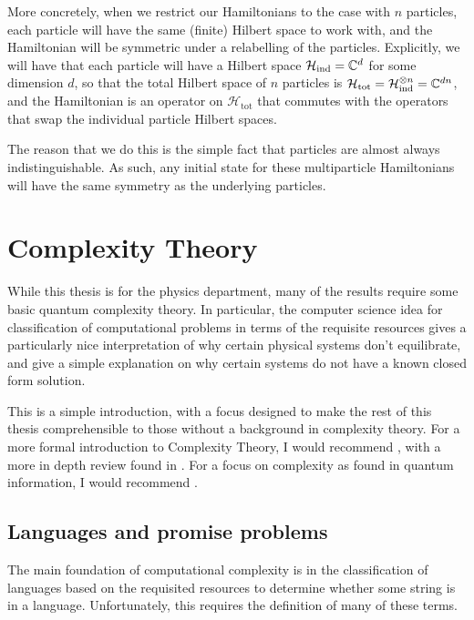 \documentclass[../thesis-main/thesis-main]{subfiles}
\begin{document}
More concretely, when we restrict our Hamiltonians to the case with $n$ particles, each particle will have the same (finite) Hilbert space to work with, and the Hamiltonian will be symmetric under a relabelling of the particles.  Explicitly, we will have that each particle will have a Hilbert space $\mathcal{H}_{\text{ind}} = \mathbb{C}^{d}$ for some dimension $d$, so that the total Hilbert space of $n$ particles is $\mathcal{H}_{\text{tot}}  = \mathcal{H}_{\text{ind}}^{\otimes n} = \mathbb{C}^{dn}$, and the Hamiltonian is an operator on $\mathcal{H}_{\text{tot}}$ that commutes with the operators that swap the individual particle Hilbert spaces.


The reason that we do this is the simple fact that particles are almost always indistinguishable.  As such, any initial state for these multiparticle Hamiltonians will have the same symmetry as the underlying particles.  

\section{Complexity Theory}
\label{sec:complexity_theory}

While this thesis is for the physics department, many of the results require some basic quantum complexity theory.  In particular, the computer science idea for classification of computational problems in terms of the requisite resources gives a particularly nice interpretation of why certain physical systems don't equilibrate, and give a simple explanation on why certain systems do not have a known closed form solution.

This is a simple introduction, with a focus designed to make the rest of this thesis comprehensible to those without a background in complexity theory.  For a more formal introduction to Complexity Theory, I would recommend \cite{SipserToC}, with a more in depth review found in \cite{ABCC}.  For a focus on complexity as found in quantum information, I would recommend \cite{Wat09}.

\subsection{Languages and promise problems}

The main foundation of computational complexity is in the classification of languages based on the requisited resources to determine whether some string is in a language.  Unfortunately, this requires the definition of many of these terms.  
\end{document}
